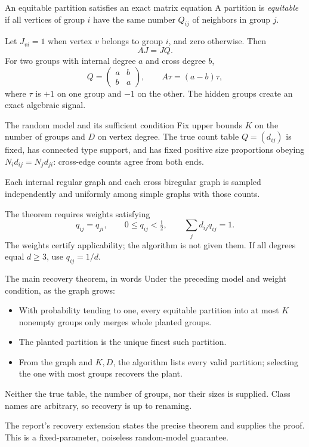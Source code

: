 \documentclass[aspectratio=169,11pt]{beamer}
\newcommand{\source}[1]{\par\vfill{\scriptsize\color{black!65}#1}}
\begin{document}
\begin{frame}{An equitable partition satisfies an exact matrix equation}
A partition is \emph{equitable} if all vertices of group $i$ have the
same number $Q_{ij}$ of neighbors in group $j$.

Let $J_{vi}=1$ when vertex $v$ belongs to group $i$, and zero otherwise.
Then
\[
 AJ=JQ.
\]
For two groups with internal degree $a$ and cross degree $b$,
\[
 Q=\begin{pmatrix}a&b\\b&a\end{pmatrix},\qquad
 A\tau=(a-b)\tau,
\]
where $\tau$ is $+1$ on one group and $-1$ on the other.
The hidden groups create an exact algebraic signal.
\end{frame}

\begin{frame}{The random model and its sufficient condition}
Fix upper bounds $K$ on the number of groups and $D$ on vertex degree.
The true count table $Q=(d_{ij})$ is fixed, has connected type support,
and has fixed positive size proportions obeying
$N_i d_{ij}=N_j d_{ji}$: cross-edge counts agree from both ends.

Each internal regular graph and each cross biregular graph is sampled
independently and uniformly among simple graphs with those counts.

The theorem requires weights satisfying
\[
 q_{ij}=q_{ji},\qquad 0\le q_{ij}<\tfrac12,\qquad
 \sum_jd_{ij}q_{ij}=1.
\]
The weights certify applicability; the algorithm is not given them.
If all degrees equal $d\ge3$, use $q_{ij}=1/d$.
\end{frame}

\begin{frame}{The main recovery theorem, in words}
Under the preceding model and weight condition, as the graph grows:
\begin{itemize}
\item With probability tending to one, every equitable partition into at
most $K$ nonempty groups only merges whole planted groups.
\item The planted partition is the unique finest such partition.
\item From the graph and $K,D$, the algorithm lists every valid partition;
selecting the one with most groups recovers the plant.
\end{itemize}
Neither the true table, the number of groups, nor their sizes is supplied.
Class names are arbitrary, so recovery is up to renaming.
\source{The report's recovery extension states the precise theorem and supplies the proof. This is a fixed-parameter, noiseless random-model guarantee.}
\end{frame}
\end{document}
